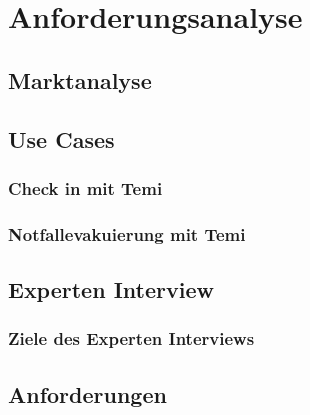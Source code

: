 \chapter{Anforderungsanalyse}
\label{chap:anforderungsanalyse}
\section{Marktanalyse}
\label{sec:marktanalyse}
\section{Use Cases}
\subsection{Check in mit Temi}
\subsection{Notfallevakuierung mit Temi}
\section{Experten Interview}
\subsection{Ziele des Experten Interviews}
\section{Anforderungen}
